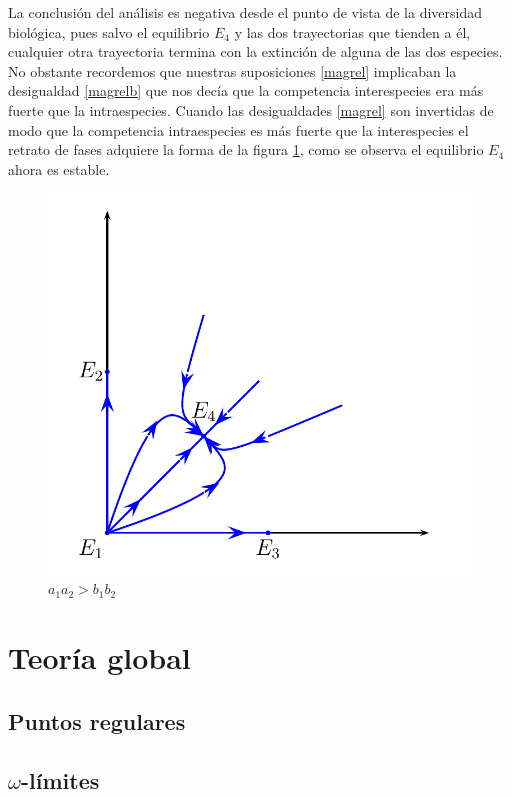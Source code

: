 La conclusión del análisis es negativa desde el punto de vista de
la diversidad biológica, pues salvo el equilibrio $E_4$ y las dos
trayectorias que tienden a él, cualquier otra trayectoria termina
con la extinción de alguna de las dos especies. No obstante
recordemos que nuestras suposiciones \eqref{magrel} implicaban la
desigualdad \eqref{magrelb} que nos decía que la competencia
interespecies era más fuerte que la intraespecies. Cuando las
desigualdades \eqref{magrel} son invertidas de modo que la
competencia intraespecies es más fuerte que la interespecies el
retrato de fases adquiere la forma de la figura \ref{modbiob},
como se observa el equilibrio $E_4$ ahora es estable.
\begin{figure}[h]
\begin{center}
\includegraphics[scale=.4]{imagenes/EspCompIV.png}
\end{center}
\caption{$a_1a_2>b_1b_2$}\label{modbiob}
\end{figure}

\section{Teoría global}

\subsection{Puntos regulares}

\subsection{$\omega$-límites}

